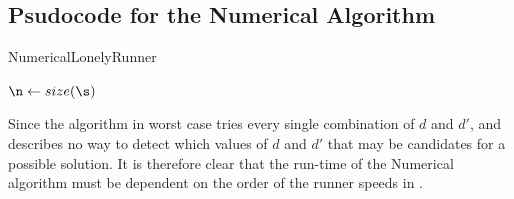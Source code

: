 \subsection{Psudocode for the Numerical Algorithm}
\begin{algorithm}[H]
  \caption{NumericalLonelyRunner}
  \highlights
  
  $\n \gets size(\s)$

  \return \no
\end{algorithm}

Since the algorithm in worst case tries every single combination of
$d$ and $d\prime$, and \cite{invis} describes no way to detect which
values of $d$ and $d\prime$ that may be candidates for a possible
solution. It is therefore clear that the run-time of the Numerical
algorithm must be dependent on the order of the runner speeds in \comS.

